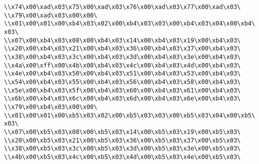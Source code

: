 \verb|\\x74\x00\xad\x03\x75\x00\xad\x03\x76\x00\xad\x03\x77\x00\xad\x03\|\newline
\verb|\\x79\x00\xad\x03\x00\x00\|\newline
\verb|\\x01\x00\x01\x00\xb4\x03\x02\x00\xb4\x03\x03\x00\xb4\x03\x04\x00\xb4\x03\|\newline
\verb|\\x07\x00\xb4\x03\x08\x00\xb4\x03\x14\x00\xb4\x03\x19\x00\xb4\x03\|\newline
\verb|\\x20\x00\xb4\x03\x21\x00\xb4\x03\x36\x00\xb4\x03\x37\x00\xb4\x03\|\newline
\verb|\\x38\x00\xb4\x03\x3c\x00\xb4\x03\x3d\x00\xb4\x03\x3e\x00\xb4\x03\|\newline
\verb|\\x4a\x00\xff\x00\x4b\x00\xb4\x03\x4c\x00\xb4\x03\x4d\x00\xb4\x03\|\newline
\verb|\\x4e\x00\xb4\x03\x50\x00\xb4\x03\x51\x00\xb4\x03\x53\x00\xb4\x03\|\newline
\verb|\\x54\x00\xb4\x03\x55\x00\xb4\x03\x56\x00\xb4\x03\x58\x00\xb4\x03\|\newline
\verb|\\x5e\x00\xb4\x03\x5f\x00\xb4\x03\x60\x00\xb4\x03\x61\x00\xb4\x03\|\newline
\verb|\\x6b\x00\xb4\x03\x6c\x00\xb4\x03\x6d\x00\xb4\x03\x6e\x00\xb4\x03\|\newline
\verb|\\x79\x00\xb4\x03\x00\x00\|\newline
\verb|\\x01\x00\x01\x00\xb5\x03\x02\x00\xb5\x03\x03\x00\xb5\x03\x04\x00\xb5\x03\|\newline
\verb|\\x07\x00\xb5\x03\x08\x00\xb5\x03\x14\x00\xb5\x03\x19\x00\xb5\x03\|\newline
\verb|\\x20\x00\xb5\x03\x21\x00\xb5\x03\x36\x00\xb5\x03\x37\x00\xb5\x03\|\newline
\verb|\\x38\x00\xb5\x03\x3c\x00\xb5\x03\x3d\x00\xb5\x03\x3e\x00\xb5\x03\|\newline
\verb|\\x4b\x00\xb5\x03\x4c\x00\xb5\x03\x4d\x00\xb5\x03\x4e\x00\xb5\x03\|\newline
